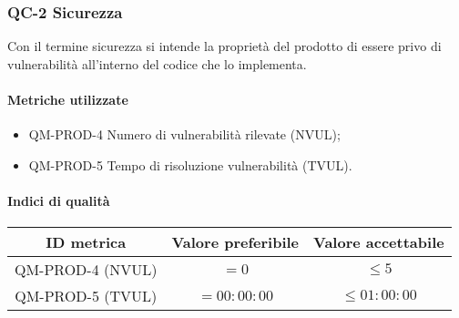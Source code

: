 \subsubsection{QC-2 Sicurezza}
Con il termine sicurezza si intende la proprietà del prodotto di essere privo di vulnerabilità all'interno del codice che lo implementa.

	\paragraph{Metriche utilizzate}
	\begin{itemize}
		\item QM-PROD-4 Numero di vulnerabilità rilevate (NVUL);
		\item QM-PROD-5 Tempo di risoluzione vulnerabilità (TVUL).
	\end{itemize}

	\paragraph{Indici di qualità}
	\begin{center}
		\begin{tabular}{|c|c|c|}
			\rowcolor{lighter-grayer}
			\hline
			\textbf{ID metrica} & \textbf{Valore preferibile} & \textbf{Valore accettabile} \\
			\hline
			QM-PROD-4 (NVUL) & \(= 0\) & \(\le 5\) \\
			\hline
			QM-PROD-5 (TVUL) & \(= 00:00:00\) &  \(\le 01:00:00\) \\
			\hline
		\end{tabular}
	\end{center}

